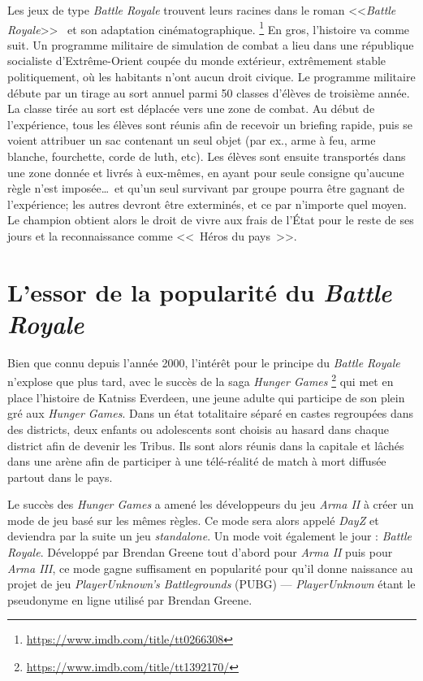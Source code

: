Les jeux de type \emph{Battle Royale} trouvent leurs racines dans le roman <<\emph{Battle Royale}>>~\cite{takami2003battle} et son adaptation cinématographique.%
%
\footnote{\url{https://www.imdb.com/title/tt0266308}}
%
En gros, l'histoire va comme suit.
Un programme militaire de simulation de combat a lieu dans une république socialiste d'Extrême-Orient coupée du monde extérieur, extrêmement stable politiquement, o\`u les habitants n'ont aucun droit civique. Le programme militaire d\'ebute par un tirage au sort annuel parmi 50 classes d'élèves de troisième année. La classe tirée au sort est déplacée vers une zone de combat. Au début de l'expérience, tous les élèves sont réunis afin de recevoir un briefing rapide, puis se voient attribuer un sac contenant un seul objet (par ex., arme à feu, arme blanche, fourchette, corde de luth, etc). Les \'el\`eves sont ensuite transport\'es dans une zone donnée et livrés à eux-mêmes, en ayant pour seule consigne qu'aucune règle n'est imposée\ldots\ et qu'un seul survivant par groupe pourra être gagnant de l'expérience;  les autres devront être exterminés, et ce par n'importe quel moyen. Le champion obtient alors le droit de vivre aux frais de l'État pour le reste de ses jours et la reconnaissance comme <<~Héros du pays~>>.

\section{L'essor de la popularité du \emph{Battle Royale}}
Bien que connu depuis l'ann\'ee 2000, l'intérêt pour le principe du \emph{Battle Royale} n'explose que plus tard, avec le succès de la saga \emph{Hunger Games}%
%
\footnote{\url{https://www.imdb.com/title/tt1392170/}}
%
 qui met en place l'histoire de Katniss Everdeen, une jeune adulte qui participe de son plein gré aux \emph{Hunger Games}. Dans un état totalitaire séparé en castes regroupées dans des districts, deux enfants ou adolescents sont choisis au hasard dans chaque district afin de devenir les Tribus. Ils sont alors réunis dans la capitale et lâchés dans une arène afin de participer à une télé-réalité de match à mort diffusée partout dans le pays.

Le succès des \emph{Hunger Games} a amené les développeurs du jeu \emph{Arma II} à créer un mode de jeu basé sur les mêmes règles. Ce mode sera alors appelé \emph{DayZ} et deviendra par la suite un jeu \emph{standalone}. Un mode voit également le jour : \emph{Battle Royale}. Développé par Brendan Greene tout d'abord pour \emph{Arma II} puis pour \emph{Arma III}, ce mode gagne suffisament en popularité pour qu'il donne naissance au projet de jeu \emph{PlayerUnknown's Battlegrounds} (PUBG) --- \emph{PlayerUnknown} étant le pseudonyme en ligne utilisé par Brendan Greene.

